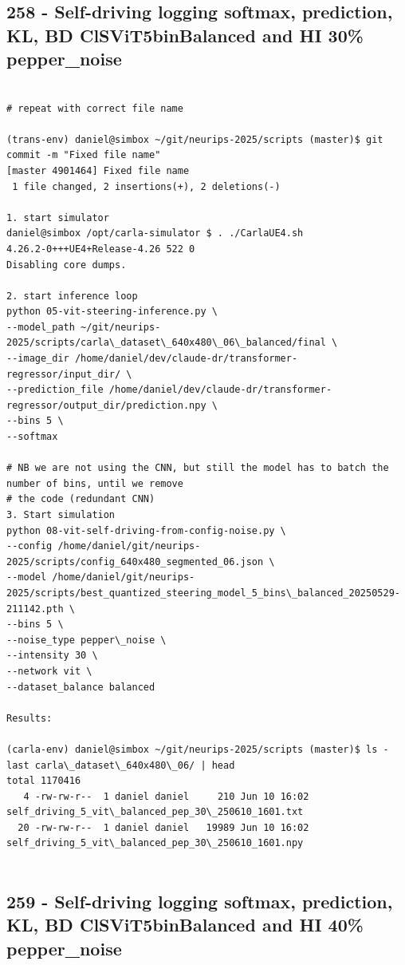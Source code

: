 \subsection{258 - Self-driving logging softmax, prediction, KL, BD ClSViT5binBalanced and HI 30\% pepper\_noise}
\label{app_res:258}
\begin{verbatim}

# repeat with correct file name

(trans-env) daniel@simbox ~/git/neurips-2025/scripts (master)$ git commit -m "Fixed file name"
[master 4901464] Fixed file name
 1 file changed, 2 insertions(+), 2 deletions(-)
 
1. start simulator
daniel@simbox /opt/carla-simulator $ . ./CarlaUE4.sh 
4.26.2-0+++UE4+Release-4.26 522 0
Disabling core dumps.

2. start inference loop
python 05-vit-steering-inference.py \
--model_path ~/git/neurips-2025/scripts/carla\_dataset\_640x480\_06\_balanced/final \
--image_dir /home/daniel/dev/claude-dr/transformer-regressor/input_dir/ \
--prediction_file /home/daniel/dev/claude-dr/transformer-regressor/output_dir/prediction.npy \
--bins 5 \
--softmax

# NB we are not using the CNN, but still the model has to batch the number of bins, until we remove
# the code (redundant CNN)
3. Start simulation
python 08-vit-self-driving-from-config-noise.py \
--config /home/daniel/git/neurips-2025/scripts/config_640x480_segmented_06.json \
--model /home/daniel/git/neurips-2025/scripts/best_quantized_steering_model_5_bins\_balanced_20250529-211142.pth \
--bins 5 \
--noise_type pepper\_noise \
--intensity 30 \
--network vit \
--dataset_balance balanced

Results:

(carla-env) daniel@simbox ~/git/neurips-2025/scripts (master)$ ls -last carla\_dataset\_640x480\_06/ | head
total 1170416
   4 -rw-rw-r--  1 daniel daniel     210 Jun 10 16:02 self_driving_5_vit\_balanced_pep_30\_250610_1601.txt
  20 -rw-rw-r--  1 daniel daniel   19989 Jun 10 16:02 self_driving_5_vit\_balanced_pep_30\_250610_1601.npy


\end{verbatim}

\subsection{259 - Self-driving logging softmax, prediction, KL, BD ClSViT5binBalanced and HI 40\% pepper\_noise}
\label{app_res:259}

